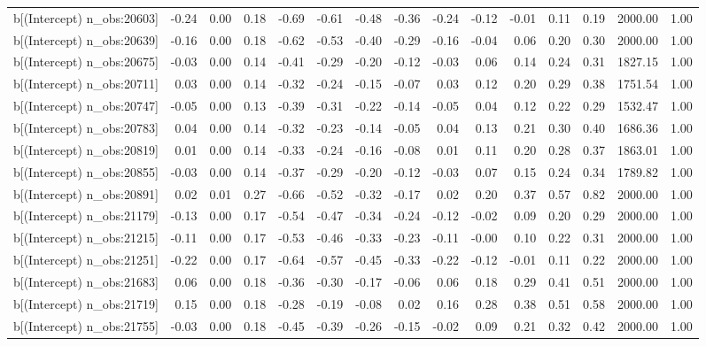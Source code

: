 \begin{table}[ht]
\begin{tabular}{rrrrrrrrrrrrrrr}
  b[(Intercept) n\_obs:20603] & -0.24 & 0.00 & 0.18 & -0.69 & -0.61 & -0.48 & -0.36 & -0.24 & -0.12 & -0.01 & 0.11 & 0.19 & 2000.00 & 1.00 \\ 
  b[(Intercept) n\_obs:20639] & -0.16 & 0.00 & 0.18 & -0.62 & -0.53 & -0.40 & -0.29 & -0.16 & -0.04 & 0.06 & 0.20 & 0.30 & 2000.00 & 1.00 \\ 
  b[(Intercept) n\_obs:20675] & -0.03 & 0.00 & 0.14 & -0.41 & -0.29 & -0.20 & -0.12 & -0.03 & 0.06 & 0.14 & 0.24 & 0.31 & 1827.15 & 1.00 \\ 
  b[(Intercept) n\_obs:20711] & 0.03 & 0.00 & 0.14 & -0.32 & -0.24 & -0.15 & -0.07 & 0.03 & 0.12 & 0.20 & 0.29 & 0.38 & 1751.54 & 1.00 \\ 
  b[(Intercept) n\_obs:20747] & -0.05 & 0.00 & 0.13 & -0.39 & -0.31 & -0.22 & -0.14 & -0.05 & 0.04 & 0.12 & 0.22 & 0.29 & 1532.47 & 1.00 \\ 
  b[(Intercept) n\_obs:20783] & 0.04 & 0.00 & 0.14 & -0.32 & -0.23 & -0.14 & -0.05 & 0.04 & 0.13 & 0.21 & 0.30 & 0.40 & 1686.36 & 1.00 \\ 
  b[(Intercept) n\_obs:20819] & 0.01 & 0.00 & 0.14 & -0.33 & -0.24 & -0.16 & -0.08 & 0.01 & 0.11 & 0.20 & 0.28 & 0.37 & 1863.01 & 1.00 \\ 
  b[(Intercept) n\_obs:20855] & -0.03 & 0.00 & 0.14 & -0.37 & -0.29 & -0.20 & -0.12 & -0.03 & 0.07 & 0.15 & 0.24 & 0.34 & 1789.82 & 1.00 \\ 
  b[(Intercept) n\_obs:20891] & 0.02 & 0.01 & 0.27 & -0.66 & -0.52 & -0.32 & -0.17 & 0.02 & 0.20 & 0.37 & 0.57 & 0.82 & 2000.00 & 1.00 \\ 
  b[(Intercept) n\_obs:21179] & -0.13 & 0.00 & 0.17 & -0.54 & -0.47 & -0.34 & -0.24 & -0.12 & -0.02 & 0.09 & 0.20 & 0.29 & 2000.00 & 1.00 \\ 
  b[(Intercept) n\_obs:21215] & -0.11 & 0.00 & 0.17 & -0.53 & -0.46 & -0.33 & -0.23 & -0.11 & -0.00 & 0.10 & 0.22 & 0.31 & 2000.00 & 1.00 \\ 
  b[(Intercept) n\_obs:21251] & -0.22 & 0.00 & 0.17 & -0.64 & -0.57 & -0.45 & -0.33 & -0.22 & -0.12 & -0.01 & 0.11 & 0.22 & 2000.00 & 1.00 \\ 
  b[(Intercept) n\_obs:21683] & 0.06 & 0.00 & 0.18 & -0.36 & -0.30 & -0.17 & -0.06 & 0.06 & 0.18 & 0.29 & 0.41 & 0.51 & 2000.00 & 1.00 \\ 
  b[(Intercept) n\_obs:21719] & 0.15 & 0.00 & 0.18 & -0.28 & -0.19 & -0.08 & 0.02 & 0.16 & 0.28 & 0.38 & 0.51 & 0.58 & 2000.00 & 1.00 \\ 
  b[(Intercept) n\_obs:21755] & -0.03 & 0.00 & 0.18 & -0.45 & -0.39 & -0.26 & -0.15 & -0.02 & 0.09 & 0.21 & 0.32 & 0.42 & 2000.00 & 1.00 \\ 

\end{tabular}
\end{table}

